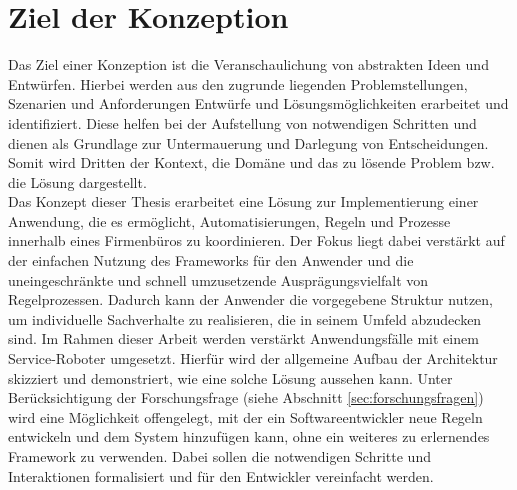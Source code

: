 \section{Ziel der Konzeption}
\label{sec:konzeptziele}
    Das Ziel einer Konzeption ist die Veranschaulichung von abstrakten Ideen und Entwürfen. %
    Hierbei werden aus den zugrunde liegenden Problemstellungen, Szenarien und Anforderungen Entwürfe und 
    Lösungsmöglichkeiten erarbeitet und identifiziert. Diese helfen bei der Aufstellung von notwendigen Schritten 
    und dienen als Grundlage zur Untermauerung und Darlegung von Entscheidungen. Somit wird Dritten der Kontext, die 
    Domäne und das zu lösende Problem bzw. die Lösung dargestellt. 
    \\
    \linebreak
    Das Konzept dieser Thesis 
    erarbeitet eine Lösung zur Implementierung einer Anwendung, die es ermöglicht, Automatisierungen, Regeln und Prozesse innerhalb eines 
    Firmenbüros zu koordinieren. Der Fokus liegt dabei verstärkt auf der einfachen Nutzung des Frameworks für den Anwender und 
    die uneingeschränkte und schnell umzusetzende Ausprägungsvielfalt von Regelprozessen. Dadurch kann der Anwender die vorgegebene Struktur nutzen, um individuelle 
    Sachverhalte zu realisieren, die in seinem Umfeld abzudecken sind. Im Rahmen dieser Arbeit werden verstärkt Anwendungsfälle mit einem Service-Roboter 
    umgesetzt.
    Hierfür wird der allgemeine Aufbau der Architektur skizziert und demonstriert, wie eine solche Lösung aussehen kann. 
    Unter Berücksichtigung der Forschungsfrage (siehe Abschnitt \ref{sec:forschungsfragen}) wird eine Möglichkeit offengelegt, mit der 
    ein Softwareentwickler neue Regeln entwickeln und dem System hinzufügen kann, ohne ein weiteres zu erlernendes Framework zu verwenden. 
    Dabei sollen die notwendigen Schritte und Interaktionen formalisiert und für den Entwickler vereinfacht werden. 

